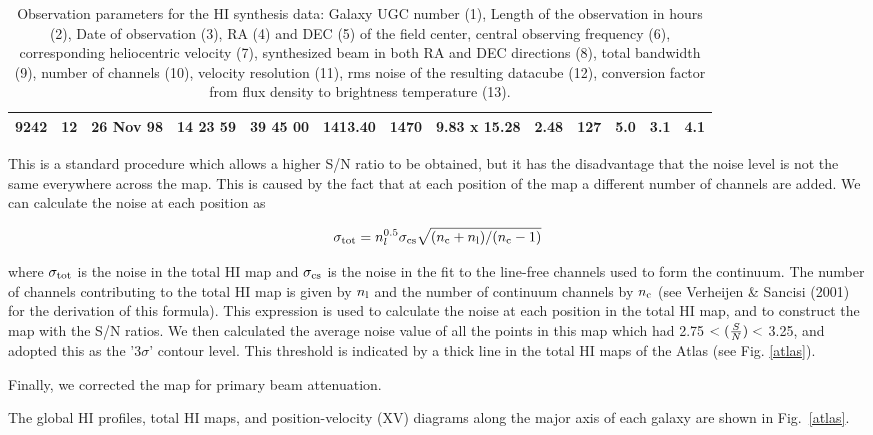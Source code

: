 \documentclass{aa}
\begin{document}
\begin{table}
\begin{tabular}{ccccclrcccrcc}
9242 & 12 & 26 Nov 98 & 14 23 59 & 39 45 00 & 1413.40 &     1470 & 9.83 x 15.28 & 2.48 & 127 & 5.0 & 3.1 & 4.1 \\
\hline
\end{tabular}
\caption{Observation parameters for the HI synthesis data: Galaxy UGC
  number (1), Length of the observation in hours (2), Date of
  observation (3), RA (4) and DEC (5) of the field center, central
  observing frequency (6), corresponding heliocentric velocity (7),
  synthesized beam in both RA and
  DEC directions (8), total bandwidth (9), number of channels (10),
  velocity resolution (11), rms noise of the resulting datacube (12),
  conversion factor from flux density to brightness temperature (13). }
\label{tab:hidata}
\end{table}

This is a standard procedure which allows a higher S/N ratio to be
obtained, but it has the disadvantage 
that the noise level is not the same everywhere across the map. This
is caused by the fact that at each position of the map a different
number of channels are added. We can calculate the noise at
each position as  

\begin{equation}
\sigma_{\rm tot}=n_l^{0.5}\sigma_{\rm cs}\sqrt{(n_{\rm c}+n_{\rm l})
    /(n_{\rm c}-1)}
\end{equation}

where $\sigma_{\rm tot}$ is the noise in the total HI map and $\sigma_{\rm cs}$
is the noise in the fit to the line-free channels used to
form the continuum. The number of channels contributing to the 
total HI map is given by $n_{\rm l}$ and the number of continuum channels by
$n_{\rm c}$ (see Verheijen \& Sancisi (2001) for the derivation of this
formula). This expression is used to calculate the noise at each position  
in the total HI map, and to construct the map with the S/N
ratios. We then calculated the average noise value of all 
the points in this map which had 2.75 $< ({S\over{N}} ) <$ 3.25, and
adopted this as the '3$\sigma$' contour level. This threshold is
indicated by a thick line in the total HI maps of the Atlas (see
Fig. \ref{atlas}).  

Finally, we corrected the map for primary beam attenuation.

The global HI profiles, total HI maps, and position-velocity (XV)
diagrams along the major axis of each galaxy are shown in
Fig.~\ref{atlas}.
\end{document}
